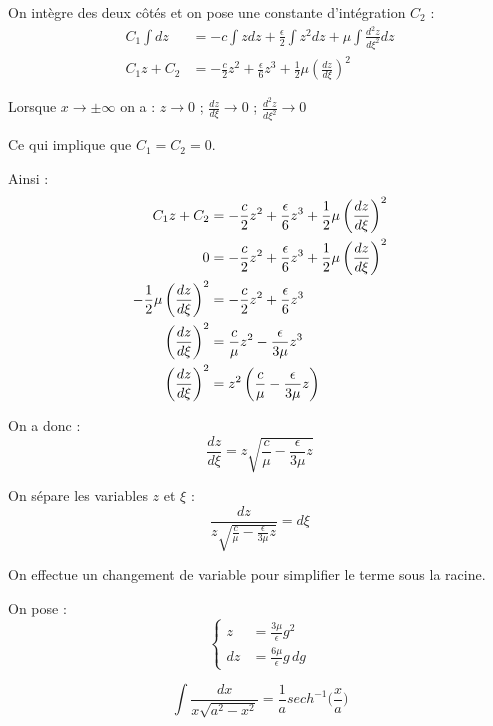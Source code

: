 \documentclass[11pt,a4paper]{article}
\begin{document}
On intègre des deux côtés et on pose une constante d'intégration $C_2$ :
\begin{align*}
  C_{1}\int dz &=-c\int z dz+\frac{\epsilon}{2}\int z^{2}dz
  +\mu\int\frac{d^{2}z}{d\xi^{2}}dz \\
  C_{1}z+C_{2} &=-\frac{c}{2}z^{2}+\frac{\epsilon}{6}z^{3}
  +\frac{1}{2}\mu\left(\frac{dz}{d\xi}\right)^{2}
\end{align*}

Lorsque $x \to \pm \infty$ on a : $z \to 0$ ; $\frac{dz}{d\xi} \to 0$ ; $\frac{d^{2}z}{d\xi^{2}}\to 0$

Ce qui implique que $C_{1}=C_{2}=0$.


Ainsi :
\begin{align}
  C_{1}z+C_{2} &=-\frac{c}{2}z^{2}+\frac{\epsilon}{6}z^{3}
  +\frac{1}{2}\mu\left(\frac{dz}{d\xi}\right)^{2} \notag\\
  0 &=-\frac{c}{2}z^{2}+\frac{\epsilon}{6}z^{3}+\frac{1}{2}\mu\left(\frac{dz}{d\xi}\right)^{2} \notag \\
  -\frac{1}{2}\mu\left(\frac{dz}{d\xi}\right)^{2} &=-\frac{c}{2}z^{2}+\frac{\epsilon}{6}z^{3} \notag \\
  \left(\frac{dz}{d\xi}\right)^{2} 
  &=\frac{c}{\mu}z^{2}-\frac{\epsilon}{3\mu}z^{3} \notag\\
  \left(\frac{dz}{d\xi}\right)^{2} 
  &=z^{2}\left(\frac{c}{\mu}-\frac{\epsilon}{3\mu}z\right)\label{eq:dz2}
\end{align}

On a donc :
\[ \boxed{\frac{dz}{d\xi} = z\sqrt{\frac{c}{\mu}-\frac{\epsilon}{3\mu}z}} \]

On sépare les variables $z$ et $\xi$ :
\begin{equation}
  \frac{dz}{z\sqrt{\frac{c}{\mu}-\frac{\epsilon}{3\mu}z}} = d\xi
  \label{eq:separee}
\end{equation}

On effectue un changement de variable pour simplifier le terme sous la racine. 

On pose :
\begin{equation}
  \begin{cases}
    z &= \frac{3\mu}{\epsilon}g^2 \\
    dz &= \frac{6\mu}{\epsilon}g \, dg 
  \end{cases}
  \label{eq:intro_g}
\end{equation}

\begin{tcolorbox}[
  colback=black!5!white,
  colframe=white!50!black,
  title=Rappel,
  fonttitle=\bfseries
]
\begin{equation}
  \int \frac{dx}{x\sqrt{a^{2} - x^{2}}} = \frac{1}{a} sech^{-1} \Big(\frac{x}{a}\Big)
  \label{eq:rappel}
\end{equation}
\end{tcolorbox}
\end{document}
